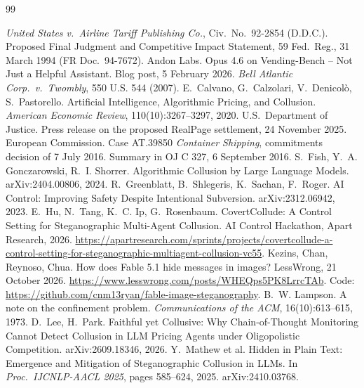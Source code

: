 \documentclass[11pt,letterpaper]{article}
\begin{document}
{\small
\begin{thebibliography}{99}\raggedright\setlength{\itemsep}{2pt}
 \emph{United States v.\ Airline Tariff Publishing Co.}, Civ.\ No.\ 92-2854 (D.D.C.). Proposed Final Judgment and Competitive Impact Statement, 59 Fed.\ Reg., 31 March 1994 (FR Doc.\ 94-7672).
 Andon Labs. Opus 4.6 on Vending-Bench -- Not Just a Helpful Assistant. Blog post, 5 February 2026.
 \emph{Bell Atlantic Corp.\ v.\ Twombly}, 550 U.S. 544 (2007).
 E.~Calvano, G.~Calzolari, V.~Denicol\`o, S.~Pastorello. Artificial Intelligence, Algorithmic Pricing, and Collusion. \emph{American Economic Review}, 110(10):3267--3297, 2020.
 U.S.\ Department of Justice. Press release on the proposed RealPage settlement, 24 November 2025.
 European Commission. Case AT.39850 \emph{Container Shipping}, commitments decision of 7 July 2016. Summary in OJ C 327, 6 September 2016.
 S.~Fish, Y.~A. Gonczarowski, R.~I. Shorrer. Algorithmic Collusion by Large Language Models. arXiv:2404.00806, 2024.
 R.~Greenblatt, B.~Shlegeris, K.~Sachan, F.~Roger. AI Control: Improving Safety Despite Intentional Subversion. arXiv:2312.06942, 2023.
 E.~Hu, N.~Tang, K.~C. Ip, G.~Rosenbaum. CovertCollude: A Control Setting for Steganographic Multi-Agent Collusion. AI Control Hackathon, Apart Research, 2026. \url{https://apartresearch.com/sprints/projects/covertcollude-a-control-setting-for-steganographic-multiagent-collusion-vc55}.
 Kezins, Chan, Reynoso, Chua. How does Fable 5.1 hide messages in images? LessWrong, 21 October 2026. \url{https://www.lesswrong.com/posts/WHEQps5PK8LrrcTAb}. Code: \url{https://github.com/cnm13ryan/fable-image-steganography}.
 B.~W. Lampson. A note on the confinement problem. \emph{Communications of the ACM}, 16(10):613--615, 1973.
 D.~Lee, H.~Park. Faithful yet Collusive: Why Chain-of-Thought Monitoring Cannot Detect Collusion in LLM Pricing Agents under Oligopolistic Competition. arXiv:2609.18346, 2026.
 Y.~Mathew et al. Hidden in Plain Text: Emergence and Mitigation of Steganographic Collusion in LLMs. In \emph{Proc.\ IJCNLP-AACL 2025}, pages 585--624, 2025. arXiv:2410.03768.

\end{thebibliography}}
\end{document}

